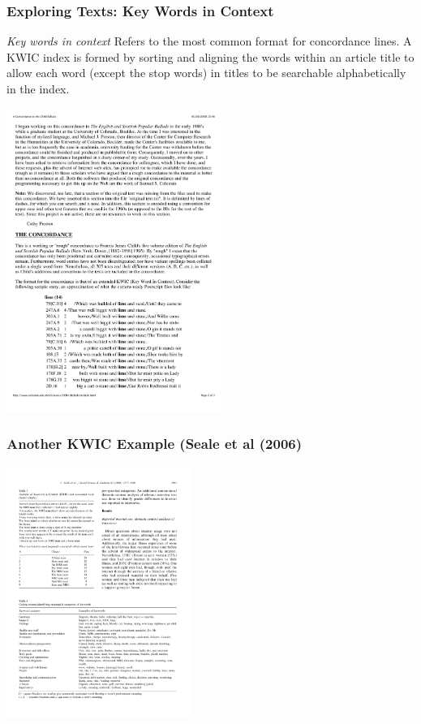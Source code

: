 \documentclass[11pt,handout]{beamer}
\begin{document}
\begin{frame}
 \frametitle{Exploring Texts: Key Words in Context}
 \begin{description}
  \pause \item[KWIC] \emph{Key words in context} Refers to the most
  common format for concordance lines.  A KWIC index is formed by
  sorting and aligning the words within an article title to allow each
  word (except the stop words) in titles to be searchable
  alphabetically in the index.
 \end{description}
 \begin{center}
  \includegraphics[width=7cm]{kwic.pdf}
 \end{center}
\end{frame}



\begin{frame}
 \frametitle{Another KWIC Example (Seale et al (2006)}
 \begin{center}
  \includegraphics[width=6cm]{SealeKWIC.pdf}
 \end{center}
\end{frame}
\end{document}
